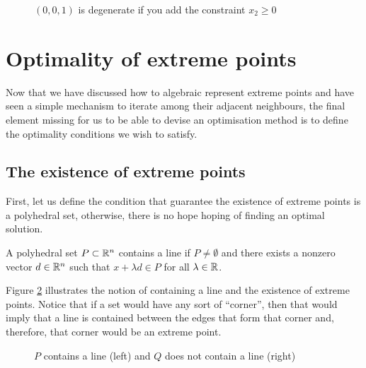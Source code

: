 \begin{figure}
    \caption{$(0,0,1)$ is degenerate if you add the constraint $x_2 \ge 0$} \label{p1c3:fig:redundancy_and_degeneration}
\end{figure}


\section{Optimality of extreme points}

Now that we have discussed how to algebraic represent extreme points and have seen a simple mechanism to iterate among their adjacent neighbours, the final element missing for us to be able to devise an optimisation method is to define the optimality conditions we wish to satisfy.


\subsection{The existence of extreme points}

First, let us define the condition that guarantee the existence of extreme points is a polyhedral set, otherwise, there is no hope hoping of finding an optimal solution.

\begin{definition}\label{p1c3:def:line_containing}
	A polyhedral set $P \subset \mathbb{R}^n$ contains a line if $P \neq \emptyset$ and there exists a nonzero vector $d \in \mathbb{R}^n$ such that $x + \lambda d \in P$ for all $\lambda \in \mathbb{R}$.
\end{definition}

Figure \ref{p1c3:fig:line_containing} illustrates the notion of containing a line and the existence of extreme points. Notice that if a set would have any sort of ``corner'', then that would imply that a line is contained between the edges that form that corner and, therefore, that corner would be an extreme point.

\begin{figure}[h]
	\caption{$P$ contains a line (left) and $Q$ does not contain a line (right)} \label{p1c3:fig:line_containing}	
\end{figure}

